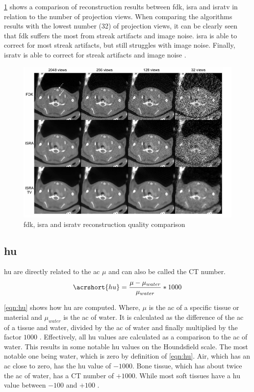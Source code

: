 \noindent
\cref{fig:alg-comp} shows a comparison of reconstruction results between \gls{fdk}, \gls{isra} and \gls{isratv}
in relation to the number of projection views.
When comparing the algorithms results with the lowest number (32) of projection views,
it can be clearly seen that \gls{fdk} suffers the most from streak artifacts and image noise.
\gls{isra} is able to correct for most streak artifacts, but still struggles with image noise.
Finally, \gls{isratv} is able to correct for streak artifacts and image noise \cite{vandeghinsteLowDoseMicroCTImaging2013}.
\begin{figure}[h]
	\centerline{
		\includegraphics[scale=0.5]{images/alg-comp.png}}
	\caption{\gls{fdk}, \gls{isra} and \gls{isratv} reconstruction quality comparison \cite{vandeghinsteLowDoseMicroCTImaging2013}}
	\label{fig:alg-comp}
\end{figure}

\subsection{\acrfull{hu}}
\label{s:b-hu}
\acrfull{hu} are directly related to the \acrfull{ac} $\mu$
and can also be called the CT number.
\begin{equation} \label{eqn:hu}
	\acrshort{hu} = \frac{\mu - \mu_{water}}{\mu_{water}}*1000
\end{equation}

\noindent
\cref{eqn:hu} shows how \acrshort{hu} are computed.
Where, $\mu$ is the \acrlong{ac} of a specific tissue or material and $\mu_{water}$
is the \acrlong{ac} of water.
It is calculated as the difference of the \acrlong{ac} of a tissue and water,
divided by the \acrshort{ac} of water and finally multiplied by the factor $1000$ \cite{liMicrocomputedTomographySmall2008}.
Effectively, all \acrshort{hu} values are calculated as a comparison to the \acrlong{ac} of water.
This results in some notable \acrshort{hu} values on the Houndsfield scale.
The most notable one being water, which is zero by definition of \cref{eqn:hu}.
Air, which has an \acrlong{ac} close to zero, has the \acrshort{hu} value of $-1000$.
Bone tissue, which has about twice the \acrlong{ac} of water, has a CT number of $+1000$.
While most soft tissues have a \acrshort{hu} value between $-100$ and $+100$ \cite{liMicrocomputedTomographySmall2008}.

